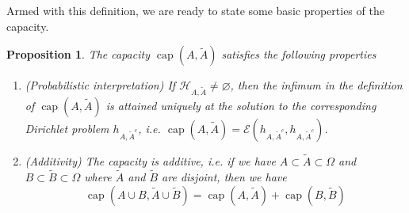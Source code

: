 \documentclass[english, aip, jcp, priprint, graphicx,floatfix]{revtex4-1}
\newtheorem{proposition}{Proposition}
\theoremstyle{plain}
\theoremstyle{definition}
\theoremstyle{plain}
\begin{document}
Armed with this definition, we are ready to state some basic properties of the
capacity.

\begin{proposition}\label{prop:capacity}
The capacity $\ensuremath{\operatorname{cap}} (A, \tilde{A})$ satisfies the
following properties
\begin{enumerate}
\item (Probabilistic interpretation) If $\mathcal{H}_{A, \tilde{A}} \neq
\varnothing$, then the infimum in the definition of
$\ensuremath{\operatorname{cap}} (A, \tilde{A})$ is attained uniquely at
the solution to the corresponding Dirichlet problem $h_{A, \tilde{A}^c}$,
i.e. $\ensuremath{\operatorname{cap}} (A, \tilde{A}) = \mathcal{E} (h_{A,
\tilde{A}^c}, h_{A, \tilde{A}^c})$.

\item (Additivity) The capacity is additive, i.e. if we have $A \subset
\tilde{A} \subset \Omega$ and $B \subset \tilde{B} \subset \Omega$ where
$\tilde{A}$ and $\tilde{B}$ are disjoint, then we have
\[ \ensuremath{\operatorname{cap}} (A \cup B, \tilde{A} \cup \tilde{B})
=\ensuremath{\operatorname{cap}} (A, \tilde{A})
+\ensuremath{\operatorname{cap}} (B, \tilde{B}) \]
\end{enumerate}
\end{proposition}
\end{document}
